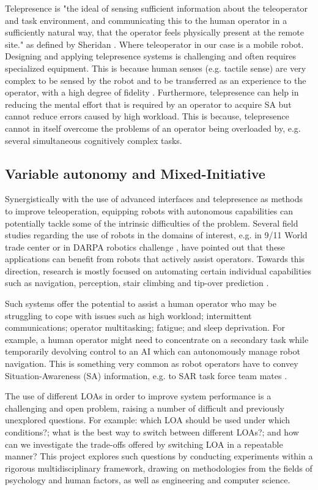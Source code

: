 \documentclass[a4paper,12pt,oneside,openright]{bhamthesis}
\begin{document}
Telepresence is "the ideal of sensing sufficient information about the teleoperator and task environment, and communicating this to the human operator in a sufficiently natural way, that the operator feels physically present at the remote site." as defined by Sheridan \cite{Sheridan1989}. Where teleoperator in our case is a mobile robot. Designing and applying telepresence systems is challenging and often requires specialized equipment. This is because human senses (e.g. tactile sense) are very complex to be sensed by the robot and to be transferred as an experience to the operator, with a high degree of fidelity \cite{Caldwell1996,Caldwell1994}. Furthermore, telepresence can help in reducing the mental effort that is required by an operator to acquire SA but cannot reduce errors caused by high workload. This is because, telepresence cannot in itself overcome the problems of an operator being overloaded by, e.g. several simultaneous cognitively complex tasks.

\subsection{Variable autonomy and Mixed-Initiative}
Synergistically with the use of advanced interfaces and telepresence as methods to improve teleoperation, equipping robots with autonomous capabilities can potentially tackle some of the intrinsic difficulties of the problem. Several field studies regarding the use of robots in the domains of interest, e.g. in 9/11 World trade center \cite{CasperMurphy911} or in DARPA robotics challenge \cite{Yanco2015DARPA}, have pointed out that these applications can benefit from robots that actively assist operators. Towards this direction, research is mostly focused on automating certain individual capabilities such as navigation, perception, stair climbing and tip-over prediction \cite{Liu2013}. 

Such systems offer the potential to assist a human operator who may be struggling to cope with issues such as high workload; intermittent communications; operator multitasking; fatigue; and sleep deprivation. For example, a human operator might need to concentrate on a secondary task while temporarily devolving control to an AI which can autonomously manage robot navigation. This is something very common as robot operators have to convey Situation-Awareness (SA) information, e.g. to SAR task force team mates \cite{Murphy2005a,Burke2004a}.

The use of different LOAs in order to improve system performance is a challenging and open problem, raising a number of difficult and previously unexplored questions. For example: which LOA should be used under which conditions?; what is the best way to switch between different LOAs?; and how can we investigate the trade-offs offered by switching LOA in a repeatable manner? This project explores such questions by conducting experiments within a rigorous multidisciplinary framework, drawing on methodologies from the fields of psychology and human factors, as well as engineering and computer science. 
\end{document}
